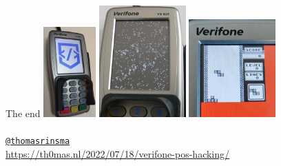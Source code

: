 \documentclass[12pt,aspectratio=169]{beamer}
\begin{document}
\begin{frame}{The end}
\centering
\includegraphics[width=0.15\textwidth]{media/codean_logo}
\includegraphics[width=0.25\textwidth]{media/gol}
\includegraphics[width=0.25\textwidth]{media/gb_tetris}
~\\~\\
\href{https://twitter.com/thomasrinsma}{\texttt{@thomasrinsma}}\\
\url{https://th0mas.nl/2022/07/18/verifone-pos-hacking/}
\end{frame}







\end{document}
